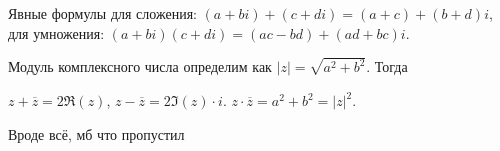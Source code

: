  Явные формулы для сложения: $(a+bi) + (c+di) = (a+c)+(b+d)i$, для умножения:  $(a + bi)(c + di) = (ac - bd) + (ad + bc)i$.

 Модуль комплексного числа определим как $|z| = \sqrt{a^2 + b^2}$. Тогда


 $z + \overline{z} = 2\Re(z)$,  $z - \overline{z} = 2 \Im(z) \cdot i$.  $z \cdot \overline{z} = a^2 + b^2 = |z|^2$.

 Вроде всё, мб что пропустил
